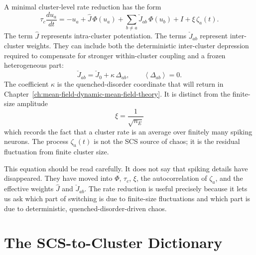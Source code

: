 A minimal cluster-level rate reduction has the form
\[
        \tau_c \frac{d u_a}{dt}
        =
        -u_a
        +
        \widehat J\,\Phi(u_a)
        +
        \sum_{b\ne a}\check J_{ab}\,\Phi(u_b)
        +
        I
        +
        \xi\,\zeta_a(t).
        \label{eq:ch06-cluster-rate-reduction}
\]
The term \(\widehat J\) represents intra-cluster potentiation. The terms
\(\check J_{ab}\) represent inter-cluster weights. They can include both the
deterministic inter-cluster depression required to compensate for stronger
within-cluster coupling and a frozen heterogeneous part:
\[
        \check J_{ab}
        =
        \check J_{0}
        +
        \kappa\,\Delta_{ab},
        \qquad
        \left\langle \Delta_{ab}\right\rangle=0 .
        \label{eq:ch06-check-j-kappa}
\]
The coefficient \(\kappa\) is the quenched-disorder coordinate that will return
in Chapter~\ref{ch:mean-field-dynamic-mean-field-theory}. It is distinct from
the finite-size amplitude
\[
        \xi = \frac{1}{\sqrt{n_E}}
        \label{eq:ch06-xi-definition}
\]
which records the fact that a cluster rate is an average over finitely many spiking
neurons. The process \(\zeta_a(t)\) is not the SCS source of chaos; it is the
residual fluctuation from finite cluster size.

This equation should be read carefully. It does not say that spiking details
have disappeared. They have moved into \(\Phi\), \(\tau_c\), \(\xi\), the
autocorrelation of \(\zeta_a\), and the effective weights \(\widehat J\) and
\(\check J_{ab}\). The rate reduction is useful precisely because it lets us ask
which part of switching is due to finite-size fluctuations and which part is due
to deterministic, quenched-disorder-driven chaos.

\section{The SCS-to-Cluster Dictionary}
\label{sec:ch06-scs-cluster-dictionary}


